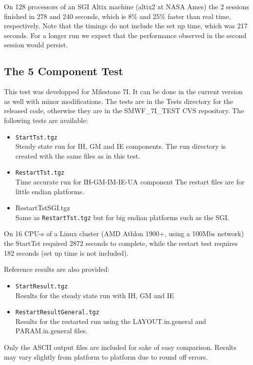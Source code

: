 \documentclass[twoside,10pt]{article}
\begin{document}
On 128 processors of an SGI Altix machine (altix2 at NASA Ames) 
the 2 sessions finished in 278 and 240 seconds, 
which is 8\% and 25\% faster than real time, respectively.
Note that the timings do not include the set up time, which was 217 seconds.
For a longer run we expect that the performance observed in the
second session would persist.

\subsection{The 5 Component Test}

This test was developped for Milestone 7I. 
It can be done in the current version as well with minor
modifications. 
The tests are in the Tests directory for the released code, otherwise
they are in the SMWF\_7I\_TEST CVS repository.  The following tests
are available:
\begin{itemize}
\item {\tt StartTst.tgz}\\
      Steady state run for IH, GM and IE components.
      The run directory is created with the same files as in
      this test.

\item {\tt RestartTst.tgz}\\
      Time accurate run for IH-GM-IM-IE-UA component
      The restart files are for little endian platforms.

\item {RestartTstSGI.tgz}\\
      Same as {\tt RestartTst.tgz} 
      but for big endian platforms such as the SGI.
\end{itemize}
On 16 CPU-s of a Linux cluster (AMD Athlon 1900+, using a 100Mbs
network) the StartTst required 2872 seconds to complete, while the
restart test requires 182 seconds (set up time is not included).

Reference results are also  provided:
\begin{itemize}
\item {\tt StartResult.tgz}\\
       Results for the steady state run with IH, GM and IE

\item {\tt RestartResultGeneral.tgz}\\
      Results for the restarted run using the 
      LAYOUT.in.general and PARAM.in.general files.
\end{itemize}
Only the ASCII output files are included for sake of easy comparison.
Results may vary slightly from platform to platform due to round off errors.
\end{document}
